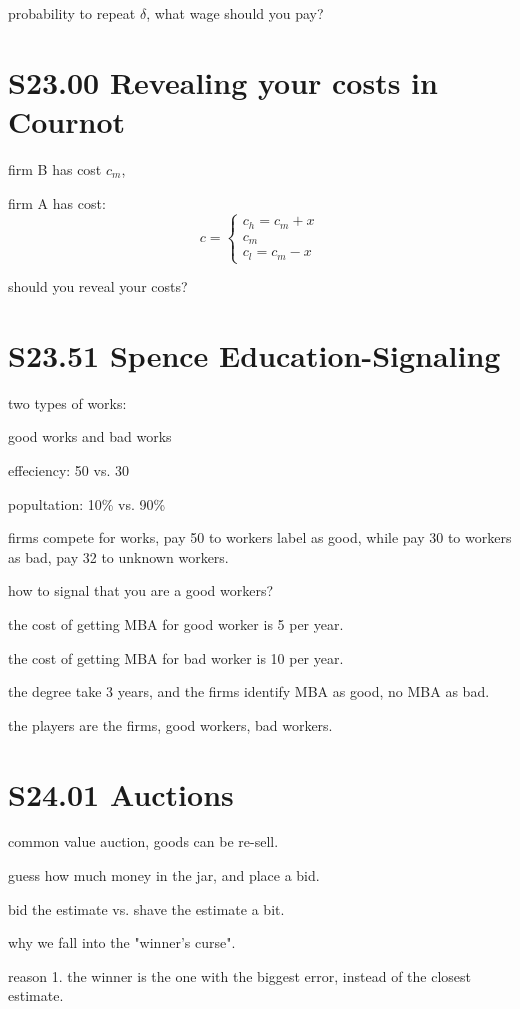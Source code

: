 \documentclass[12pt,a4paper]{article}
\begin{document}
\vspace{0.5cm}
probability to repeat $\delta$, what wage should you pay?



\section{S23.00 Revealing your costs in Cournot}

firm B has cost $c_m$,

\noindent firm A has cost:
\[
c = \left\{\begin{array}{l}
c_h = c_m +x \\
c_m \\
c_l = c_m -x 
\end{array}
\right.
\]

should you reveal your costs?

\section{S23.51 Spence Education-Signaling}
two types of works:

good works and bad works

effeciency: 50 vs. 30

popultation: 10\% vs. 90\%

\noindent firms compete for works, pay 50 to workers label as good, while pay 30 to workers as bad, pay 32 to unknown workers.

\noindent how to signal that you are a good workers?

the cost of getting MBA for good worker is 5 per year.

the cost of getting MBA for bad worker is 10 per year.

the degree take 3 years, and the firms identify MBA as good, no MBA as bad.

\noindent the players are the firms, good workers, bad workers.

\section{S24.01 Auctions}
common value auction, goods can be re-sell.

guess how much money in the jar, and place a bid.

bid the estimate vs. shave the estimate a bit.

why we fall into the "winner's curse".

reason 1. the winner is the one with the biggest error, instead of the closest estimate.
\end{document}
